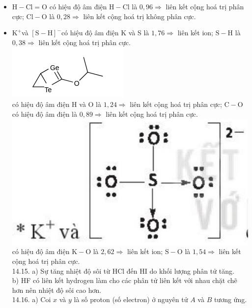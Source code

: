 \documentclass[10pt]{article}
\begin{document}
\begin{itemize}
  \item $\mathrm{H}-\mathrm{Cl}=\mathrm{O}$ có hiệu độ âm điện $\mathrm{H}-\mathrm{Cl}$ là $0,96 \Rightarrow$ liên kết cộng hoá trị phân cực; $\mathrm{Cl}-\mathrm{O}$ là $0,28 \Rightarrow$ liên kết cộng hoá trị không phân cực.
  \item $\mathrm{K}^{+}$và $[\mathrm{S}-\mathrm{H}]^{-}$có hiệu độ âm điện K và S là $1,76 \Rightarrow$ liên kết ion; $\mathrm{S}-\mathrm{H}$ là $0,38 \Rightarrow$ liên kết cộng hoá trị phân cực.\\
\includegraphics{smile-6a38256abe366e5ecea4b3692930725576666a9c}\\
có hiệu độ âm điện H và O là $1,24 \Rightarrow$ liên kết cộng hoá trị phân cực; $\mathrm{C}-\mathrm{O}$ có hiệu độ âm điện là $0,89 \Rightarrow$ liên kết cộng hoá trị phân cực.\\
\includegraphics[max width=\textwidth, center]{2025_10_23_ee735750217b2aca435cg-30(1)}\\
có hiệu độ âm điện $\mathrm{K}-\mathrm{O}$ là $2,62 \Rightarrow$ liên kết ion; $\mathrm{S}-\mathrm{O}$ là $1,54 \Rightarrow$ liên kết cộng hoá trị phân cực.\\
14.15. a) Sự tăng nhiệt độ sôi từ HCl đến HI do khối lượng phân tử tăng.\\
b) HF có liên kết hydrogen làm cho các phân tử liên kết với nhau chặt chẽ hơn nên nhiệt độ sôi cao hơn.\\
14.16. a) Coi $x$ và $y$ là số proton (số electron) ở nguyên tử $A$ và $B$ tương ứng.
\end{itemize}
\end{document}
